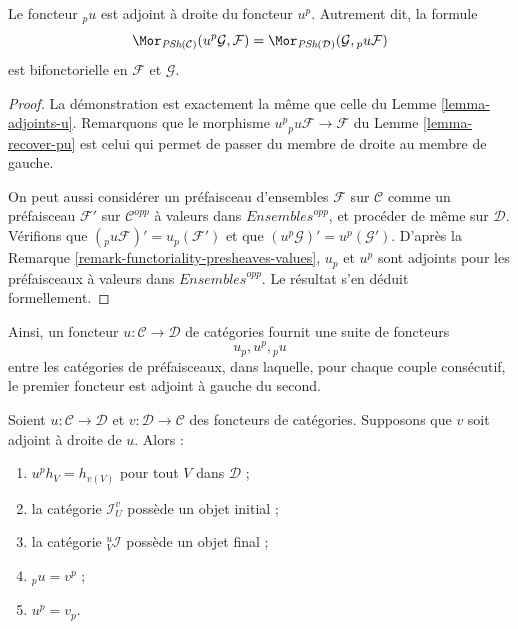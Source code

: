 \begin{lemma}
\label{lemma-adjoints-pu}
Le foncteur ${}_pu$ est adjoint à droite du foncteur $u^p$.
Autrement dit, la formule
$$
\Mor_{\textit{PSh}(\mathcal{C})}(u^p\mathcal{G}, \mathcal{F})
=
\Mor_{\textit{PSh}(\mathcal{D})}(\mathcal{G}, {}_pu\mathcal{F})
$$
est bifonctorielle en $\mathcal{F}$ et $\mathcal{G}$.
\end{lemma}

\begin{proof}
La démonstration est exactement la même que celle du
Lemme \ref{lemma-adjoints-u}. Remarquons que le morphisme
$u^p{}_pu \mathcal{F} \to \mathcal{F}$ du
Lemme \ref{lemma-recover-pu} est celui qui permet de passer
du membre de droite au membre de gauche.

\medskip\noindent
On peut aussi considérer un préfaisceau d’ensembles $\mathcal{F}$ sur
$\mathcal{C}$ comme un préfaisceau $\mathcal{F}'$ sur
$\mathcal{C}^{opp}$ à valeurs dans $\textit{Ensembles}^{opp}$,
et procéder de même sur $\mathcal{D}$.
Vérifions que $({}_pu \mathcal{F})' = u_p(\mathcal{F}')$ et que
$(u^p\mathcal{G})' = u^p(\mathcal{G}')$.
D’après la Remarque \ref{remark-functoriality-presheaves-values},
$u_p$ et $u^p$ sont adjoints pour les préfaisceaux à valeurs dans
$\textit{Ensembles}^{opp}$. Le résultat s’en déduit formellement.
\end{proof}

\noindent
Ainsi, un foncteur $u : \mathcal{C} \to \mathcal{D}$ de catégories
fournit une suite de foncteurs
$$
u_p, u^p, {}_pu
$$
entre les catégories de préfaisceaux, dans laquelle, pour chaque couple
consécutif, le premier foncteur est adjoint à gauche du second.

\begin{lemma}
\label{lemma-adjoint-functors}
Soient $u : \mathcal{C} \to \mathcal{D}$ et
$v : \mathcal{D} \to \mathcal{C}$ des foncteurs de catégories.
Supposons que $v$ soit adjoint à droite de $u$. Alors :
\begin{enumerate}
\item $u^ph_V = h_{v(V)}$ pour tout $V$ dans $\mathcal{D}$ ;
\item la catégorie $\mathcal{I}^v_U$ possède un objet initial ;
\item la catégorie ${}_V^u\mathcal{I}$ possède un objet final ;
\item ${}_pu = v^p$ ;
\item $u^p = v_p$.
\end{enumerate}
\end{lemma}

